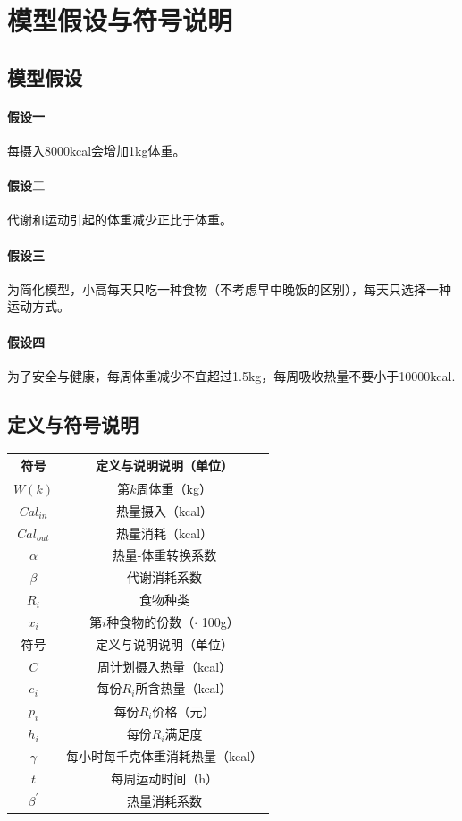 \documentclass[a4paper,12pt,onecolumn,twoside]{article}
\begin{document}
\section{模型假设与符号说明}
\subsection*{模型假设}
\paragraph{假设一~}每摄入8000kcal会增加1kg体重。
\paragraph{假设二~}代谢和运动引起的体重减少正比于体重。
\paragraph{假设三~}为简化模型，小高每天只吃一种食物（不考虑早中晚饭的区别），每天只选择一种运动方式。
\paragraph{假设四~}为了安全与健康，每周体重减少不宜超过1.5kg，每周吸收热量不要小于10000kcal.
\subsection*{定义与符号说明}
\begin{longtable}{cc}
		\toprule
		符号 & 定义与说明说明（单位）\\\hline
		$W(k)$      & 第$k$周体重（kg） \\
		$Cal_{in}$  & 热量摄入（kcal） \\
		$Cal_{out}$ & 热量消耗（kcal） \\
		$\alpha$    & 热量-体重转换系数\\
		$\beta$     & 代谢消耗系数\\
		$R_i$       & 食物种类\\
		$x_{i}$     & 第$i$种食物的份数（$\cdot$ 100g）\\
		\hline
		\hline
		符号 & 定义与说明说明（单位）\\\hline
		$C$         & 周计划摄入热量（kcal）\\
		$e_i$       & 每份$R_i$所含热量（kcal）\\
		$p_i$       & 每份$R_i$价格（元）\\
		$h_i$       & 每份$R_i$满足度\\
		$\gamma$    & 每小时每千克体重消耗热量（kcal）\\
		$t$         & 每周运动时间（h）\\
		$\beta^{\prime}$ & 热量消耗系数\\\bottomrule
\end{longtable}
\end{document}
